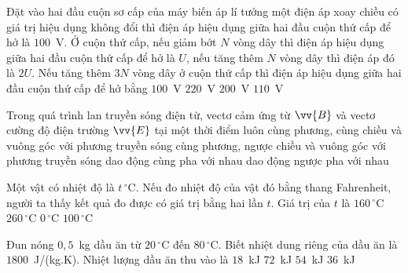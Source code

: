 	\begin{ex}%
		Đặt vào hai đầu cuộn sơ cấp của máy biến áp lí tưởng một điện áp xoay chiều có giá trị hiệu dụng không đổi thì điện áp hiệu dụng giữa hai đầu cuộn thứ cấp để hở là $100$~V. Ở cuộn thứ cấp, nếu giảm bớt $N$ vòng dây thì điện áp hiệu dụng giữa hai đầu cuộn thứ cấp để hở là $U$, nếu tăng thêm $N$ vòng dây thì điện áp đó là $2U$. Nếu tăng thêm $3N$ vòng dây ở cuộn thứ cấp thì điện áp hiệu dụng giữa hai đầu cuộn thứ cấp để hở bằng
		\choice
		{$100$~V}
		{$220$~V}
		{\True $200$~V}
		{$110$~V}
	\end{ex}

	\begin{ex}%
		Trong quá trình lan truyền sóng điện từ, vectơ cảm ứng từ $\vv{B}$ và vectơ cường độ điện trường $\vv{E}$ tại một thời điểm luôn
		\choice
		{cùng phương, cùng chiều và vuông góc với phương truyền sóng}
		{cùng phương, ngược chiều và vuông góc với phương truyền sóng}
		{\True dao động cùng pha với nhau}
		{dao động ngược pha với nhau}
	\end{ex}

	\begin{ex}%
		Một vật có nhiệt độ là $t\,^\circ\text{C}$. Nếu đo nhiệt độ của vật đó bằng thang Fahrenheit, người ta thấy kết quả đo được có giá trị bằng hai lần $t$. Giá trị của $t$ là
		\choice
		{\True $160\,^\circ\text{C}$}
		{$260\,^\circ\text{C}$}
		{$0\,^\circ\text{C}$}
		{$100\,^\circ\text{C}$}
	\end{ex}

	\begin{ex}%
		Đun nóng $0{,}5$~kg dầu ăn từ $20\,^\circ\text{C}$ đến $80\,^\circ\text{C}$. Biết nhiệt dung riêng của dầu ăn là $1800$~J/(kg.K). Nhiệt lượng dầu ăn thu vào là
		\choice
		{$18$~kJ}
		{$72$~kJ}
		{\True $54$~kJ}
		{$36$~kJ}
	\end{ex}

